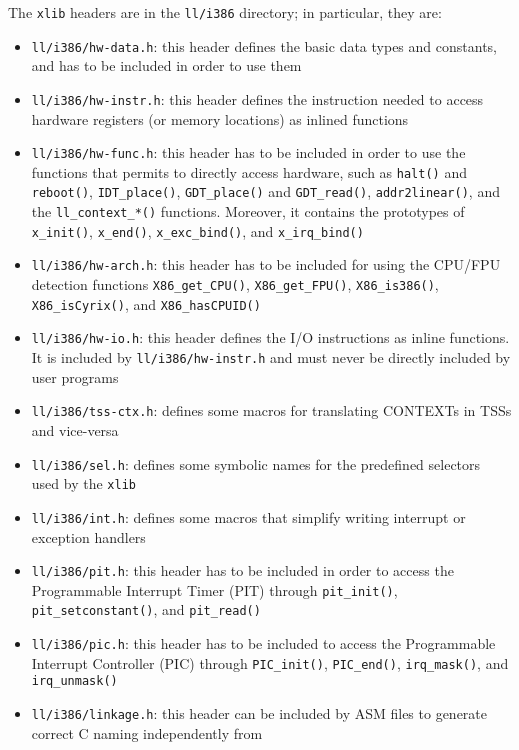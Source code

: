 \documentclass[a4paper]{report}
\begin{document}
The {\tt xlib} headers are in the {\tt ll/i386} directory; in particular,
they are:
\begin{itemize}
	\item {\tt ll/i386/hw-data.h}: this header defines the basic data
		types and constants, and has to be included in order to use
		them
	\item {\tt ll/i386/hw-instr.h}: this header defines the instruction
		needed to access hardware registers (or memory locations) as
		inlined functions
	\item {\tt ll/i386/hw-func.h}: this header has to be included in
		order to use the functions that permits to directly access
		hardware, such as {\tt halt()} and {\tt reboot()},
		{\tt IDT\_place()}, {\tt GDT\_place()}  and
		{\tt GDT\_read()}, {\tt addr2linear()}, and the
		{\tt ll\_context\_*()} functions. Moreover, it contains the
		prototypes of {\tt x\_init()}, {\tt x\_end()},
		{\tt x\_exc\_bind()}, and {\tt x\_irq\_bind()}
	\item {\tt ll/i386/hw-arch.h}: this header has to be included for
		using the CPU/FPU detection functions {\tt X86\_get\_CPU()},
		{\tt  X86\_get\_FPU()}, {\tt  X86\_is386()},
		{\tt X86\_isCyrix()}, and {\tt X86\_hasCPUID()}
	\item {\tt ll/i386/hw-io.h}: this header defines the I/O
		instructions as inline functions. It is included by
		{\tt ll/i386/hw-instr.h} and must never be directly
		included by user programs
	\item {\tt ll/i386/tss-ctx.h}: defines some macros for translating
		CONTEXTs in TSSs and vice-versa
	\item {\tt ll/i386/sel.h}: defines some symbolic names for the
		predefined selectors used by the {\tt xlib}
	\item {\tt ll/i386/int.h}: defines some macros that simplify
		writing interrupt or exception handlers
	\item {\tt ll/i386/pit.h}: this header has to be included in order
		to access the Programmable Interrupt Timer (PIT) through
		{\tt pit\_init()}, {\tt pit\_setconstant()}, and
		{\tt pit\_read()}
	\item {\tt ll/i386/pic.h}: this header has to be included to
		access the Programmable Interrupt Controller (PIC)
		through {\tt  PIC\_init()}, {\tt PIC\_end()},
		{\tt irq\_mask()}, and {\tt irq\_unmask()}
	\item {\tt ll/i386/linkage.h}: this header can be included by
		ASM files to generate correct C naming independently from

\end{itemize}
\end{document}
